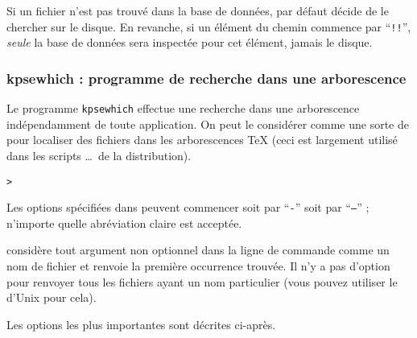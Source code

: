 \documentclass[german, english, french, 12pt]{article}
\renewcommand{\samp}[1]{\enquote{\texttt{#1}}}
\begin{document}
Si un fichier n'est pas trouvé dans la base de données, par défaut \KPS{} décide
de le chercher sur le disque. En revanche, si un élément du chemin commence par
\samp{!!}, \emph{seule} la base de données sera inspectée pour cet élément,
jamais le disque.

\subsubsection{kpsewhich : programme de recherche dans une arborescence}
\label{sec:invoking-kpsewhich}

Le programme \texttt{kpsewhich} effectue une recherche dans une arborescence
indépendamment de toute application. On peut le considérer comme une sorte de
 pour localiser des fichiers dans les arborescences \TeX{} (ceci est
largement utilisé dans les scripts \dots\ de la distribution).

\begin{alltt}
> 
\end{alltt}
Les options spécifiées dans  peuvent commencer soit par \samp{-}
soit par \samp{--} ; n'importe quelle abréviation claire est acceptée.

\KPS{} considère tout argument non optionnel dans la ligne de commande comme un
nom de fichier et renvoie la première occurrence trouvée. Il n'y a pas d'option
pour renvoyer tous les fichiers ayant un nom particulier (vous pouvez utiliser
le  d'Unix pour cela).

Les options les plus importantes sont décrites ci-après.
\end{document}
